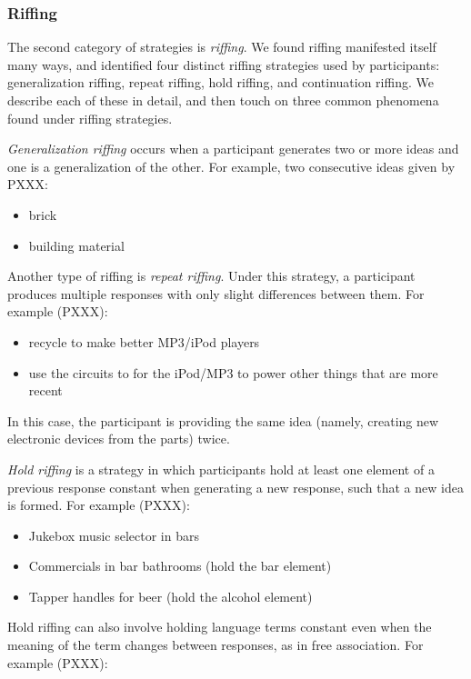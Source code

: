 \subsubsection{Riffing}

The second category of strategies is \emph{riffing}.
We found riffing manifested itself many ways, and identified four distinct riffing strategies used by participants: generalization riffing, repeat riffing, hold riffing, and continuation riffing. We describe each of these in detail, and then touch on three common phenomena found under riffing strategies.

\emph{Generalization riffing} occurs when a participant generates two or more ideas and one is a generalization of the other. For example, two consecutive ideas given by PXXX:

\begin{itemize}
    \item brick
    \item building material
\end{itemize}

Another type of riffing is \emph{repeat riffing}. Under this strategy, a participant produces multiple responses with only slight differences between them. For example (PXXX):

\begin{itemize}
    \item recycle to make better MP3/iPod players
    \item use the circuits to for the iPod/MP3 to power other things that are more recent
\end{itemize}

In this case, the participant is providing the same idea (namely, creating new electronic devices from the parts) twice.

\emph{Hold riffing} is a strategy in which participants hold at least one element of a previous response constant when generating a new response, such that a new idea is formed. For example (PXXX):

\begin{itemize}
    \item Jukebox music selector in bars
    \item Commercials in bar bathrooms (hold the bar element)
    \item Tapper handles for beer (hold the alcohol element)
\end{itemize}

Hold riffing can also involve holding language terms constant even when the meaning of the term changes between responses, as in free association. For example (PXXX):

